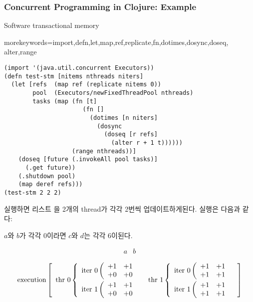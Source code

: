 \begin{frame}[fragile,allowframebreaks=1]
\frametitle{Concurrent Programming in Clojure: Example}

Software transactional memory

    {morekeywords={import,defn,let,map,ref,replicate,fn,dotimes,dosync,doseq,
                   alter,range}
    }
\begin{lstlisting}
(import '(java.util.concurrent Executors))
(defn test-stm [nitems nthreads niters]
  (let [refs  (map ref (replicate nitems 0))
        pool  (Executors/newFixedThreadPool nthreads)
        tasks (map (fn [t]
                      (fn []
                        (dotimes [n niters]
                          (dosync
                            (doseq [r refs]
                              (alter r + 1 t))))))
                   (range nthreads))]
    (doseq [future (.invokeAll pool tasks)]
      (.get future))
    (.shutdown pool)
    (map deref refs)))
(test-stm 2 2 2)
\end{lstlisting}

\pagebreak

실행하면 리스트 을 2개의 
thread가 각각 2번씩 업데이트하게된다. 실행은 다음과 같다:

$a$와 $b$가 각각 $0$이라면 $c$와 $d$는 각각 $6$이된다.

\[
\begin{array}{ll}
a & b
\end{array}
\]

\[
\textrm{execution}\left[
\begin{array}{ll}
  \textrm{thr 0}\left\{
  \begin{array}{l}
    \textrm{iter 0}\left(
    \begin{array}{ll}
    +1 & +1 \\
    +0 & +0 
    \end{array}
    \right.\\[2ex]
    \textrm{iter 1}\left(
    \begin{array}{ll}
    +1 & +1 \\
    +0 & +0 
    \end{array}
    \right.
  \end{array}
  \right.
& 
  \textrm{thr 1}\left\{
  \begin{array}{l}
    \textrm{iter 0}\left(
    \begin{array}{ll}
    +1 & +1 \\
    +1 & +1 
    \end{array}
    \right.\\[2ex]
    \textrm{iter 1}\left(
    \begin{array}{ll}
    +1 & +1 \\
    +1 & +1 
    \end{array}
    \right.
  \end{array}
  \right.
\end{array}
\right]
\]


\end{frame}
